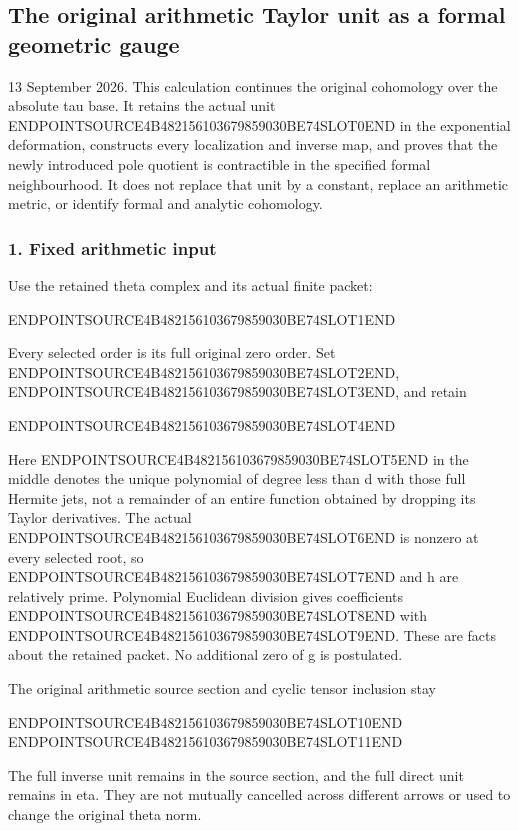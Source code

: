 \subsection{The original arithmetic Taylor unit as a formal geometric gauge}\label{endpoint-f1_unit_gauge--the-original-arithmetic-taylor-unit-as-a-formal-geometric-gauge}

13 September 2026. This calculation continues the original cohomology over the absolute tau base. It retains the actual unit ENDPOINTSOURCE4B482156103679859030BE74SLOT0END in the exponential deformation, constructs every localization and inverse map, and proves that the newly introduced pole quotient is contractible in the specified formal neighbourhood. It does not replace that unit by a constant, replace an arithmetic metric, or identify formal and analytic cohomology.

\subsubsection{1. Fixed arithmetic input}\label{endpoint-f1_unit_gauge--fixed-arithmetic-input}

Use the retained theta complex and its actual finite packet:

ENDPOINTSOURCE4B482156103679859030BE74SLOT1END

Every selected order is its full original zero order. Set ENDPOINTSOURCE4B482156103679859030BE74SLOT2END, ENDPOINTSOURCE4B482156103679859030BE74SLOT3END, and retain

ENDPOINTSOURCE4B482156103679859030BE74SLOT4END

Here ENDPOINTSOURCE4B482156103679859030BE74SLOT5END in the middle denotes the unique polynomial of degree less than d with those full Hermite jets, not a remainder of an entire function obtained by dropping its Taylor derivatives. The actual ENDPOINTSOURCE4B482156103679859030BE74SLOT6END is nonzero at every selected root, so ENDPOINTSOURCE4B482156103679859030BE74SLOT7END and h are relatively prime. Polynomial Euclidean division gives coefficients ENDPOINTSOURCE4B482156103679859030BE74SLOT8END with ENDPOINTSOURCE4B482156103679859030BE74SLOT9END. These are facts about the retained packet. No additional zero of g is postulated.

The original arithmetic source section and cyclic tensor inclusion stay

ENDPOINTSOURCE4B482156103679859030BE74SLOT10END ENDPOINTSOURCE4B482156103679859030BE74SLOT11END

The full inverse unit remains in the source section, and the full direct unit remains in eta. They are not mutually cancelled across different arrows or used to change the original theta norm.

